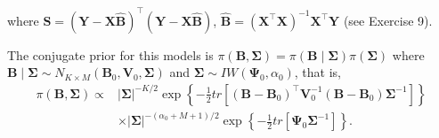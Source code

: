 where ${\bm{S}}= ({\bm{Y}}-{\bm{X}}\widehat{\bm{B}})^{\top}({\bm{Y}}-{\bm{X}}\widehat{\bm{B}})$, $\widehat{\bm{B}}= ({\bm{X}}^{\top}{\bm{X}})^{-1}{\bm{X}}^{\top}{\bm{Y}}$ (see Exercise 9).

The conjugate prior for this models is $\pi({\bm{B}},{\bm{\Sigma}})=\pi({\bm{B}}\mid {\bm{\Sigma}})\pi({\bm{\Sigma}})$ where ${\bm{B}}\mid {\bm \Sigma}\sim N_{K\times M}({\bm{B}}_{0},{\bm{V}}_{0},{\bm{\Sigma}})$ and ${\bm{\Sigma}}\sim IW({\bm{\Psi}}_{0},\alpha_{0})$, that is,
\begin{align*}
	\pi ({\bm{B}},{\bm{\Sigma}})\propto &\left|{\bm{\Sigma}} \right|^{-K/2}\exp\left\lbrace -\frac{1}{2}tr\left[({\bm{B}}-{\bm{B}}_{0})^{\top}{\bm{V}}_{0}^{-1}({\bm{B}}-{\bm{B}}_{0}){\bm \Sigma}^{-1}\right]\right\rbrace \\
	& \times \left|{\bm \Sigma} \right|^{-(\alpha_{0}+M+1)/2}\exp\left\lbrace -\frac{1}{2}tr \left[ {\bm{\Psi}}_{0} {\bm \Sigma}^{-1}\right] \right\rbrace.
\end{align*}

